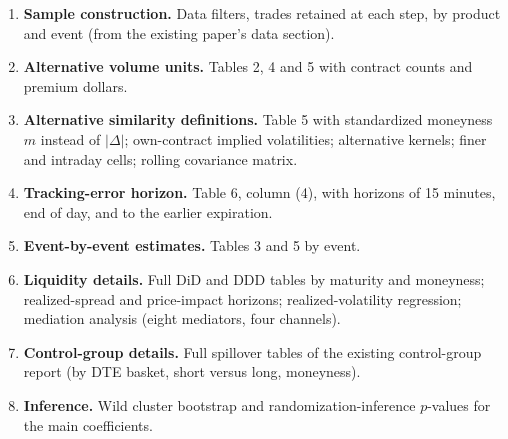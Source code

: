 \documentclass[11pt]{article}
\begin{document}
\begin{enumerate}[label=A\arabic*.,itemsep=2pt]
\item \textbf{Sample construction.} Data filters, trades retained at each step, by product and event (from the existing paper's data section).
\item \textbf{Alternative volume units.} Tables 2, 4 and 5 with contract counts and premium dollars.
\item \textbf{Alternative similarity definitions.} Table 5 with standardized moneyness $m$ instead of $|\Delta|$; own-contract implied volatilities; alternative kernels; finer and intraday cells; rolling covariance matrix.
\item \textbf{Tracking-error horizon.} Table 6, column (4), with horizons of 15 minutes, end of day, and to the earlier expiration.
\item \textbf{Event-by-event estimates.} Tables 3 and 5 by event.
\item \textbf{Liquidity details.} Full DiD and DDD tables by maturity and moneyness; realized-spread and price-impact horizons; realized-volatility regression; mediation analysis (eight mediators, four channels).
\item \textbf{Control-group details.} Full spillover tables of the existing control-group report (by DTE basket, short versus long, moneyness).
\item \textbf{Inference.} Wild cluster bootstrap and randomization-inference $p$-values for the main coefficients.
\end{enumerate}
\end{document}
